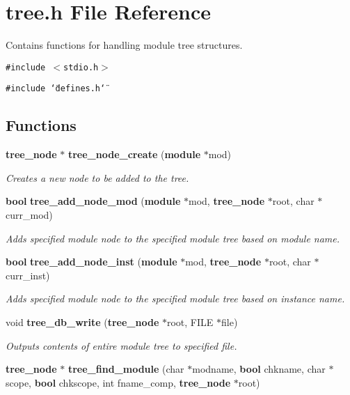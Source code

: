 \section{tree.h File Reference}
\label{tree_8h}
Contains functions for handling module tree structures. 


{\tt \#include $<$stdio.h$>$}\par
{\tt \#include \char`\"{}defines.h\char`\"{}}\par
\subsection*{Functions}
\begin{CompactItemize}
\item 
{\bf tree\_\-node} $\ast$ {\bf tree\_\-node\_\-create} ({\bf module} $\ast$mod)
\begin{CompactList}\small\item\em Creates a new node to be added to the tree.\item\end{CompactList}\item 
{\bf bool} {\bf tree\_\-add\_\-node\_\-mod} ({\bf module} $\ast$mod, {\bf tree\_\-node} $\ast$root, char $\ast$curr\_\-mod)
\begin{CompactList}\small\item\em Adds specified module node to the specified module tree based on module name.\item\end{CompactList}\item 
{\bf bool} {\bf tree\_\-add\_\-node\_\-inst} ({\bf module} $\ast$mod, {\bf tree\_\-node} $\ast$root, char $\ast$curr\_\-inst)
\begin{CompactList}\small\item\em Adds specified module node to the specified module tree based on instance name.\item\end{CompactList}\item 
void {\bf tree\_\-db\_\-write} ({\bf tree\_\-node} $\ast$root, FILE $\ast$file)
\begin{CompactList}\small\item\em Outputs contents of entire module tree to specified file.\item\end{CompactList}\item 
{\bf tree\_\-node} $\ast$ {\bf tree\_\-find\_\-module} (char $\ast$modname, {\bf bool} chkname, char $\ast$scope, {\bf bool} chkscope, int fname\_\-comp, {\bf tree\_\-node} $\ast$root)

\end{CompactItemize}
